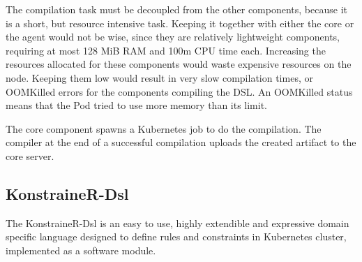 The compilation task must be decoupled from the other components, because it is a short, but resource intensive task. Keeping it together with either the core or the agent would not be wise, since they are relatively lightweight components, requiring at most 128 MiB RAM and 100m CPU time each. Increasing the resources allocated for these components would waste expensive resources on the node. Keeping them low would result in very slow compilation times, or OOMKilled errors for the components compiling the DSL. An OOMKilled status means that the Pod tried to use more memory than its limit.

The core component spawns a Kubernetes job to do the compilation. The compiler at the end of a successful compilation uploads the created artifact to the core server.

\subsection{KonstraineR-Dsl}

The KonstraineR-Dsl is an easy to use, highly extendible and expressive domain specific language designed to define rules and constraints in Kubernetes cluster, implemented as a software module.


